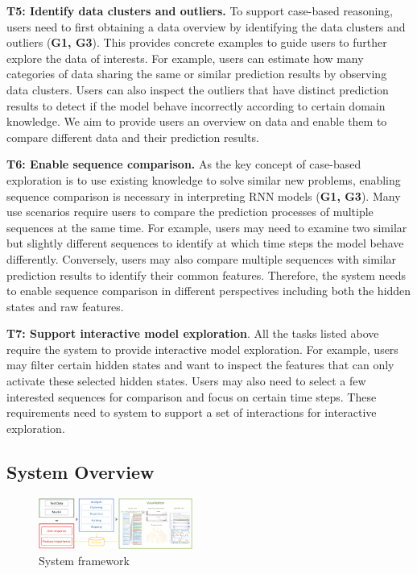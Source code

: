 \textbf{T5: Identify data clusters and outliers.}
To support case-based reasoning, users need to first obtaining a data overview by identifying the data clusters and outliers (\textbf{G1, G3}).
This provides concrete examples to guide users to further explore the data of interests.
For example, users can estimate how many categories of data sharing the same or similar prediction results by observing data clusters.
Users can also inspect the outliers that have distinct prediction results to detect if the model behave incorrectly according to certain domain knowledge.
We aim to provide users an overview on data and enable them to compare different data and their prediction results.

\textbf{T6: Enable sequence comparison.}
As the key concept of case-based exploration is to use existing knowledge to solve similar new problems, enabling sequence comparison is necessary in interpreting RNN models (\textbf{G1, G3}).
Many use scenarios require users to compare the prediction processes of multiple sequences at the same time.
For example, users may need to examine two similar but slightly different sequences to identify at which time steps the model behave differently.
Conversely, users may also compare multiple sequences with similar prediction results to identify their common features.
Therefore, the system needs to enable sequence comparison in different perspectives including both the hidden states and raw features.

\textbf{T7: Support interactive model exploration}.
All the tasks listed above require the system to provide interactive model exploration.
For example, users may filter certain hidden states and want to inspect the features that can only activate these selected hidden states.
Users may also need to select a few interested sequences for comparison and focus on certain time steps.
These requirements need to system to support a set of interactions for interactive exploration.




\subsection{System Overview}

\begin{figure}[t]
	\centering
    \includegraphics[width=0.45\textwidth]{pictures/System_framework.png}
	\vspace{-3mm}
	\caption{System framework}
	\label{fig:system_framework}
	\vspace{-4mm}
\end{figure}

